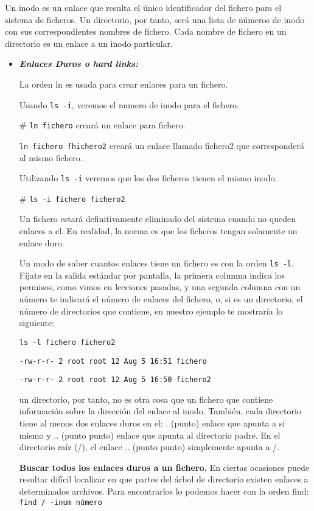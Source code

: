 \documentclass[a4paper,11pt,spanish]{article} %
\begin{document}
Un inodo es un enlace que resulta el único identificador del fichero para el sistema de ficheros.
Un directorio, por tanto, será una lista de números de inodo con sus correspondientes nombres de fichero.
Cada nombre de fichero en un directorio es un enlace a un inodo particular.

\begin{itemize}
 \item \textbf{\emph{Enlaces Duros o hard links:}}
 
 La orden ln es usada para crear enlaces para un fichero.

Usando \texttt{ls -i}, veremos el numero de inodo para el fichero.

\# \texttt{ln fichero} creará un enlace para fichero.

\texttt{ln fichero fhichero2} creará un enlace llamado fichero2 que corresponderá al mismo fichero.

Utilizando \texttt{ls -i} veremos que los dos ficheros tienen el mismo inodo.

\# \texttt{ls -i fichero fichero2}

Un fichero estará definitivamente eliminado del sistema cuando no queden enlaces a el. En realidad,
la norma es que los ficheros tengan solamente un enlace duro.

Un modo de saber cuantos enlaces tiene un fichero es con la orden \texttt{ls -l}. 
Fíjate en la salida estándar por pantalla, la primera columna indica los permisos, 
como vimos en lecciones pasadas, y una segunda columna con un número te indicará el número 
de enlaces del fichero, o, si es un directorio, el número de directorios que contiene, 
en nuestro ejemplo te mostraría lo siguiente:

\texttt{ls -l fichero fichero2}

\texttt{-rw-r-r- 2 root root 12 Aug 5 16:51 fichero}

\texttt{-rw-r-r- 2 root root 12 Aug 5 16:50 fichero2}

un directorio, por tanto, no es otra cosa que un fichero que contiene información sobre la
dirección del enlace al inodo. También, cada directorio tiene al menos dos enlaces duros en 
el: . (punto) enlace que apunta a si mismo y .. (punto punto) enlace que apunta al directorio padre.
En el directorio raíz (/), el enlace .. (punto punto) simplemente apunta a /.

\textbf{Buscar todos los enlaces duros a un fichero.}
En ciertas ocasiones puede resultar difícil localizar en que partes del árbol de directorio
existen enlaces a determinados archivos. Para encontrarlos lo podemos hacer con la orden find:
\texttt{find / -inum número}


\end{itemize}
\end{document}
